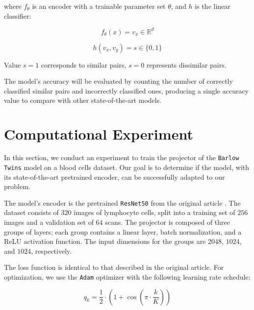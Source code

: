 \documentclass{article}
\begin{document}
where $f_{\theta}$ is an encoder with a trainable parameter set $\theta$, and 
$h$ is the linear classifier:

$$ f_{\theta}(x) = v_x \in \mathbb{R}^{d} $$

$$ h(v_x, v_y) = s \in \{0, 1\} $$

Value $s = 1$ corresponds to similar pairs, $s = 0$ represents dissimilar pairs.





The model's accuracy will be evaluated by counting the number of correctly classified similar pairs 
and incorrectly classified ones, producing a single accuracy value to compare with other 
state-of-the-art models.

\section{Computational Experiment}

In this section, we conduct an experiment to train the projector of the 
\texttt{Barlow Twins} model on a blood cells dataset. 
Our goal is to determine if the model, with its state-of-the-art pretrained encoder, 
can be successfully adapted to our problem.

The model's encoder is the pretrained \texttt{ResNet50} from the original article
\cite{zbontar2021barlow}. The dataset consists of $320$ images of lymphocyte cells, 
split into a training set of $256$ images and a validation set of $64$ scans. 
The projector is composed of three groups of layers; each group contains a linear layer, 
batch normalization, and a ReLU activation function. 
The input dimensions for the groups are $2048$, $1024$, and $1024$, respectively.

The loss function is identical to that described in the original article. 
For optimization, we use the \texttt{Adam} optimizer with the following learning rate schedule:

$$ q_k = \frac{1}{2} \cdot (1 + \cos(\pi \cdot \frac{k}{K})) $$
\end{document}

